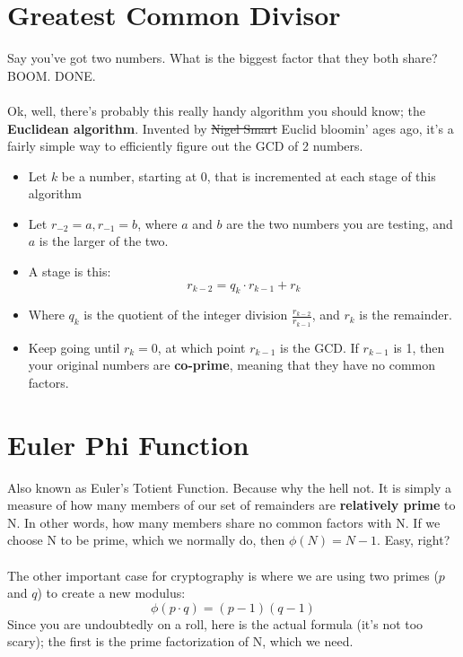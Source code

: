     \section{Greatest Common Divisor}
    Say you've got two numbers. What is the biggest factor that they both share? BOOM. DONE.\\
    \\
    Ok, well, there's probably this really handy algorithm you should know; the \textbf{Euclidean algorithm}. Invented by \sout{Nigel Smart} Euclid bloomin' ages ago, it's a fairly simple way to efficiently figure out the GCD of 2 numbers.
        \begin{itemize}
            \item Let $k$ be a number, starting at 0, that is incremented at each stage of this algorithm
            \item Let $r_{-2} = a, r_{-1} = b$, where $a$ and $b$ are the two numbers you are testing, and $a$ is the larger of the two.
            \item A stage is this: 
                $$
                    r_{k-2} = q_{k} \cdot r_{k-1} + r_{k}
                $$
            \item Where $q_{k}$ is the quotient of the integer division $\frac{r_{k-2}}{r_{k-1}}$, and $r_{k}$ is the remainder.
            \item Keep going until $r_{k} = 0$, at which point $r_{k-1}$ is the GCD. If $r_{k-1}$ is 1, then your original numbers are \textbf{co-prime}, meaning that they have no common factors.
        \end{itemize}
    
    \section{Euler Phi Function}
    Also known as Euler's Totient Function. Because why the hell not. It is simply a measure of how many members of our set of remainders are \textbf{relatively prime} to N. In other words, how many members share no common factors with N. If we choose N to be prime, which we normally do, then $\phi(N) = N - 1$. Easy, right?\\
    \\
    The other important case for cryptography is where we are using two primes ($p$ and $q$) to create a new modulus:
    $$ \phi(p \cdot q) = (p-1)(q-1)$$
    Since you are undoubtedly on a roll, here is the actual formula (it's not too scary); the first is the prime factorization of N, which we need.

